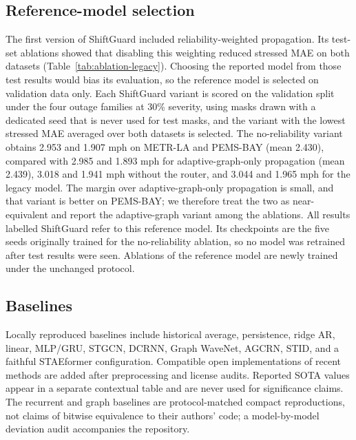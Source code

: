 \documentclass[preprint,12pt]{elsarticle}
\begin{document}
\subsection{Reference-model selection}
\label{sec:reference-selection}
The first version of ShiftGuard included reliability-weighted propagation.
Its test-set ablations showed that disabling this weighting reduced stressed
MAE on both datasets (Table~\ref{tab:ablation-legacy}). Choosing the reported
model from those test results would bias its evaluation, so the reference model
is selected on validation data only. Each ShiftGuard variant is scored on the
validation split under the four outage families at 30\% severity, using masks
drawn with a dedicated seed that is never used for test masks, and the variant
with the lowest stressed MAE averaged over both datasets is selected. The
no-reliability variant obtains 2.953 and 1.907 mph on METR-LA and PEMS-BAY
(mean 2.430), compared with 2.985 and 1.893 mph for adaptive-graph-only
propagation (mean 2.439), 3.018 and 1.941 mph without the router, and 3.044 and
1.965 mph for the legacy model. The margin over adaptive-graph-only propagation
is small, and that variant is better on PEMS-BAY; we therefore treat the two as
near-equivalent and report the adaptive-graph variant among the ablations.
All results labelled ShiftGuard refer to this reference model. Its checkpoints
are the five seeds originally trained for the no-reliability ablation, so no
model was retrained after test results were seen. Ablations of the reference
model are newly trained under the unchanged protocol.

\subsection{Baselines}
Locally reproduced baselines include historical average, persistence, ridge AR,
linear, MLP/GRU, STGCN, DCRNN, Graph WaveNet, AGCRN, STID, and a faithful
STAEformer configuration. Compatible open implementations of
recent methods are added after preprocessing and license audits. Reported SOTA
values appear in a separate contextual table and are never used for significance
claims. The recurrent and graph baselines are protocol-matched compact
reproductions, not claims of bitwise equivalence to their authors' code; a
model-by-model deviation audit accompanies the repository.
\end{document}
